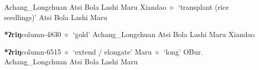          Achang\_Longchuan 
\hspace{1ex}
         Atsi 
\hspace{1ex}
         Bola 
\hspace{1ex}
         Lashi 
\hspace{1ex}
         Maru 
\hspace{1ex}
         Xiandao 
\hspace{1ex}
         $\diamond$~`transplant (rice seedlings)'
         Atsi 
\hspace{1ex}
         Bola 
\hspace{1ex}
         Lashi 
\hspace{1ex}
         Maru 
  \item {\footnotesize \textbf{*ʔriŋ}}{\tiny column-4830}
         $\diamond$~`gold'
         Achang\_Longchuan 
\hspace{1ex}
         Atsi 
\hspace{1ex}
         Bola 
\hspace{1ex}
         Lashi 
\hspace{1ex}
         Maru 
\hspace{1ex}
         Xiandao 
  \item {\footnotesize \textbf{*ʔriŋ}}{\tiny column-6515}
         $\diamond$~`extend / elongate'
         Maru 
\hspace{1ex}
         $\diamond$~`long'
         OBur. 
\hspace{1ex}
         Achang\_Longchuan 
\hspace{1ex}
         Atsi 
\hspace{1ex}
         Bola 
\hspace{1ex}
         Lashi 
\hspace{1ex}
         Maru 
\hspace{1ex}
